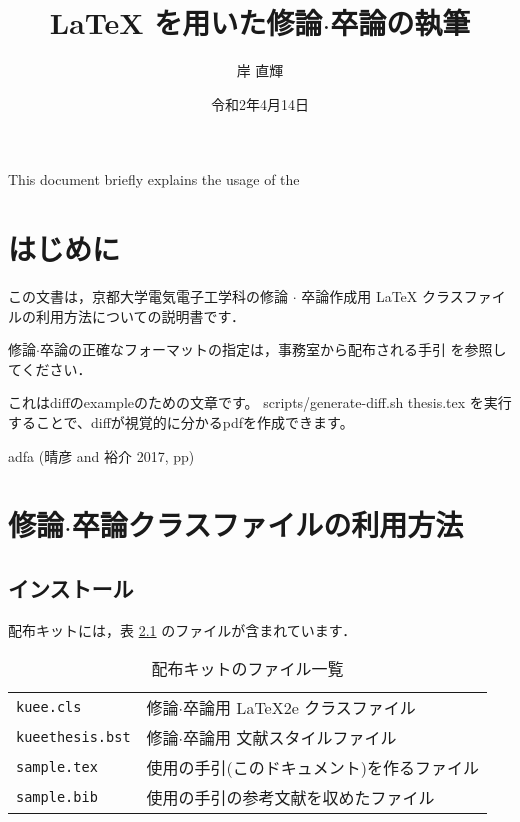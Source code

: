 \documentclass[
  sotsuron]{kuee}
\title{LaTeX を用いた修論$\cdot$卒論の執筆}
\author{岸 直輝}
\date{令和2年4月14日}
\date{}
\begin{document}
\maketitle

\begin{eabstract}This document briefly explains the usage of the\end{eabstract}

\def\lstlistingname{ソースコード}

{
        \setcounter{tocdepth}{2}
    \tableofcontents
  }
\hypertarget{ux306fux3058ux3081ux306b}{%
\chapter{はじめに}\label{ux306fux3058ux3081ux306b}}

\label{chap:intro}

この文書は，京都大学電気電子工学科の修論 \(\cdot\) 卒論作成用 \LaTeX
クラスファイルの利用方法についての説明書です．

修論\(\cdot\)卒論の正確なフォーマットの指定は，事務室から配布される手引
を参照してください．

これはdiffのexampleのための文章です。 scripts/generate-diff.sh
thesis.tex を実行することで、diffが視覚的に分かるpdfを作成できます。

\cite{GuideBook}

adfa (晴彦 and 裕介 2017, pp)

\hypertarget{ux4feeux8ad6cdotux5352ux8ad6ux30afux30e9ux30b9ux30d5ux30a1ux30a4ux30ebux306eux5229ux7528ux65b9ux6cd5}{%
\chapter{\texorpdfstring{修論\(\cdot\)卒論クラスファイルの利用方法}{修論\textbackslash cdot卒論クラスファイルの利用方法}}\label{ux4feeux8ad6cdotux5352ux8ad6ux30afux30e9ux30b9ux30d5ux30a1ux30a4ux30ebux306eux5229ux7528ux65b9ux6cd5}}

\hypertarget{ux30a4ux30f3ux30b9ux30c8ux30fcux30eb}{%
\section{インストール}\label{ux30a4ux30f3ux30b9ux30c8ux30fcux30eb}}

配布キットには，表 \ref{tab:kit} のファイルが含まれています．

\begin{table}
  \caption{配布キットのファイル一覧}\label{tab:kit}
  \begin{center}
    \begin{tabular}{ll}
      \verb+kuee.cls+ & 修論$\cdot$卒論用 \LaTeX2e{} クラスファイル       \\
      \verb+kueethesis.bst+ & 修論$\cdot$卒論用 文献スタイルファイル \\
      \verb+sample.tex+ & 使用の手引(このドキュメント)を作るファイル        \\
      \verb+sample.bib+ & 使用の手引の参考文献を収めたファイル              \\
    \end{tabular}
  \end{center}
\end{table}
\end{document}

